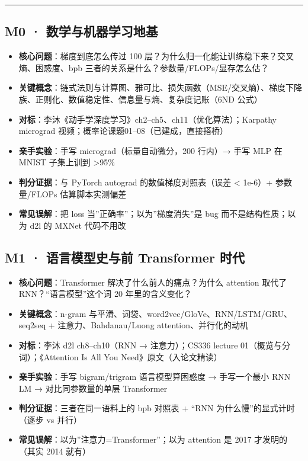\documentclass[
  chinese,
  11pt,
]{ctexart}
\providecommand{\tightlist}{%
  \setlength{\itemsep}{0pt}\setlength{\parskip}{0pt}}
\begin{document}
\begin{center}\rule{0.5\linewidth}{0.5pt}\end{center}

\subsection{M0 · 数学与机器学习地基}\label{m0-ux6570ux5b66ux4e0eux673aux5668ux5b66ux4e60ux5730ux57fa}

\begin{itemize}
\tightlist
\item
  \textbf{核心问题}：梯度到底怎么传过 100 层？为什么归一化能让训练稳下来？交叉熵、困惑度、bpb 三者的关系是什么？参数量/FLOPs/显存怎么估？
\item
  \textbf{关键概念}：链式法则与计算图、雅可比、损失函数（MSE/交叉熵）、梯度下降族、正则化、数值稳定性、信息量与熵、复杂度记账（6ND 公式）
\item
  \textbf{对标}：李沐《动手学深度学习》ch2--ch5、ch11（优化算法）；Karpathy micrograd 视频；概率论课题01--08（已建成，直接搭桥）
\item
  \textbf{亲手实验}：手写 micrograd（标量自动微分，200 行内）→ 手写 MLP 在 MNIST 子集上训到 \textgreater95\%
\item
  \textbf{判分证据}：与 PyTorch autograd 的数值梯度对照表（误差 \textless{} 1e-6）+ 参数量/FLOPs 估算脚本实测偏差
\item
  \textbf{常见误解}：把 loss 当''正确率''；以为''梯度消失''是 bug 而不是结构性质；以为 d2l 的 MXNet 代码不用改
\end{itemize}

\subsection{M1 · 语言模型史与前 Transformer 时代}\label{m1-ux8bedux8a00ux6a21ux578bux53f2ux4e0eux524d-transformer-ux65f6ux4ee3}

\begin{itemize}
\tightlist
\item
  \textbf{核心问题}：Transformer 解决了什么前人的痛点？为什么 attention 取代了 RNN？``语言模型''这个词 20 年里的含义变化？
\item
  \textbf{关键概念}：n-gram 与平滑、词袋、word2vec/GloVe、RNN/LSTM/GRU、seq2seq + 注意力、Bahdanau/Luong attention、并行化的动机
\item
  \textbf{对标}：李沐 d2l ch8--ch10（RNN → 注意力）；CS336 lecture 01（概览与分词）；《Attention Is All You Need》原文（入论文精读）
\item
  \textbf{亲手实验}：手写 bigram/trigram 语言模型算困惑度 → 手写一个最小 RNN LM → 对比同参数量的单层 Transformer
\item
  \textbf{判分证据}：三者在同一语料上的 bpb 对照表 + ``RNN 为什么慢''的显式计时（逐步 vs 并行）
\item
  \textbf{常见误解}：以为''注意力=Transformer''；以为 attention 是 2017 才发明的（其实 2014 就有）
\end{itemize}
\end{document}
